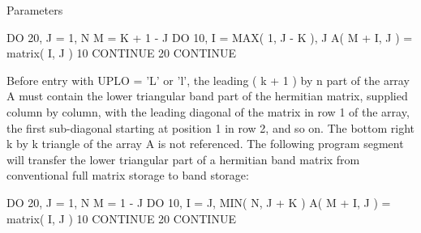 \begin{DoxyParams}[1]{Parameters}
\begin{DoxyVerb}
                 DO 20, J = 1, N
                    M = K + 1 - J
                    DO 10, I = MAX( 1, J - K ), J
                       A( M + I, J ) = matrix( I, J )
              10    CONTINUE
              20 CONTINUE

           Before entry with UPLO = 'L' or 'l', the leading ( k + 1 )
           by n part of the array A must contain the lower triangular
           band part of the hermitian matrix, supplied column by
           column, with the leading diagonal of the matrix in row 1 of
           the array, the first sub-diagonal starting at position 1 in
           row 2, and so on. The bottom right k by k triangle of the
           array A is not referenced.
           The following program segment will transfer the lower
           triangular part of a hermitian band matrix from conventional
           full matrix storage to band storage:

                 DO 20, J = 1, N
                    M = 1 - J
                    DO 10, I = J, MIN( N, J + K )
                       A( M + I, J ) = matrix( I, J )
              10    CONTINUE
              20 CONTINUE


\end{DoxyVerb}
\end{DoxyParams}
